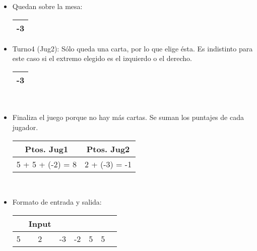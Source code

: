 \documentclass[11pt, a4paper, twoside]{article}
\begin{document}
\begin{ejemplo}
\begin{itemize}
    \item Quedan sobre la mesa:   
      \begin{center}
        \begin{tabular}{|c|}
          \hline
           -3 \\
          \hline
        \end{tabular}
      \end{center}    

    \item Turno4 (Jug2): Sólo queda una carta, por lo que elige ésta. Es indistinto para este caso 
        si el extremo elegido es el izquierdo o el derecho. 
        \begin{tabular}{|c|}
          \hline
           -3 \\
          \hline
        \end{tabular} \\

    \item Finaliza el juego porque no hay más cartas. Se suman los puntajes de cada jugador.\\
      \begin{center}
        \begin{tabular}{|c|c|}
          \hline
          Ptos. Jug1 & Ptos. Jug2 \\
          \hline
          5 + 5 + (-2) = 8 & 2 + (-3) = -1 \\
          \hline
        \end{tabular} \\ 
      \end{center}  
      
    \item Formato de entrada y salida: \\
     \begin{center} 
      \begin{minipage}{0.5\textwidth}
          \begin{tabular}{ccccccc}
             &Input \\
			 \hline 
			 5 & 2 & -3 & -2 & 5 & 5 \\
          \end{tabular}
      \end{minipage}  	
    \end{center}
	

\end{itemize}
\end{ejemplo}
\end{document}
